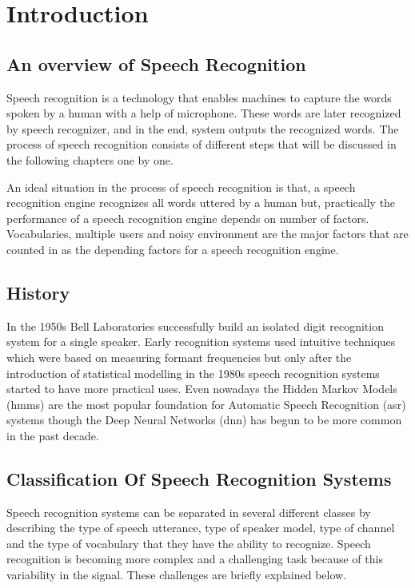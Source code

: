 \documentclass[12pt, a4paper, twoside]{report}
\begin{document}
\printglossary[type=\acronymtype]

\tableofcontents

\chapter{Introduction}
\section{An overview of Speech Recognition}
Speech recognition is a technology that enables machines to capture the words spoken by a human with a help of microphone. These words are later recognized by speech recognizer, and in the end, system outputs the recognized words. The process of speech recognition consists of different steps that will be discussed in the following chapters one by one.
\par
An ideal situation in the process of speech recognition is that, a speech recognition engine recognizes all words uttered by a human but, practically the performance of a speech recognition engine depends on number of factors. Vocabularies, multiple users and noisy environment are the major factors that are counted in as the depending factors for a speech recognition engine.
\section{History}
In the 1950s Bell Laboratories successfully build an isolated digit recognition system for a single speaker. Early recognition systems used intuitive techniques which were based on measuring formant frequencies but only after the introduction of statistical modelling in the 1980s speech recognition systems started to have more practical uses. Even nowadays the Hidden Markov Models (\acrshort{hmm}s) are the most popular foundation for Automatic Speech Recognition (\acrshort{asr}) systems though the Deep Neural Networks (\acrshort{dnn}) has begun to be more common in the past decade.
\section{Classification Of Speech Recognition Systems}
Speech recognition systems can be separated in several different classes by describing the type of speech utterance, type of speaker model, type of channel and the type of vocabulary that they have the ability to recognize. Speech recognition is becoming more complex and a challenging task because of this variability in the signal. These challenges are briefly explained below.
\end{document}
